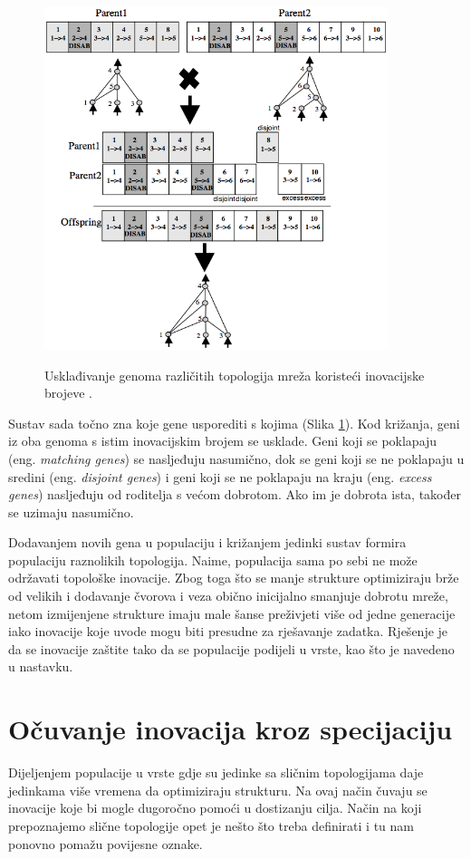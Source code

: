 \documentclass[times, utf8, seminar, numeric]{fer}
\begin{document}
\begin{figure}[ht]
  \centering
  \includegraphics[height=10cm]{slika3}\\
  \caption{Usklađivanje genoma različitih topologija mreža koristeći inovacijske brojeve \citep{rad2}.}
  \label{slika3}
\end{figure}

Sustav sada točno zna koje gene usporediti s kojima (Slika \ref{slika3}). Kod križanja, geni iz oba genoma s istim inovacijskim brojem se usklade. Geni koji se poklapaju (eng. \textit{matching genes}) se nasljeđuju nasumično, dok se geni koji se ne poklapaju u sredini (eng. \textit{disjoint genes}) i geni koji se ne poklapaju na kraju (eng. \textit{excess genes}) nasljeđuju od roditelja s većom dobrotom. Ako im je dobrota ista, također se uzimaju nasumično.

Dodavanjem novih gena u populaciju i križanjem jedinki sustav formira populaciju raznolikih topologija. Naime, populacija sama po sebi ne može održavati topološke inovacije. Zbog toga što se manje strukture optimiziraju brže od velikih i dodavanje čvorova i veza obično inicijalno smanjuje dobrotu mreže, netom izmijenjene strukture imaju male šanse preživjeti više od jedne generacije iako inovacije koje uvode mogu biti presudne za rješavanje zadatka. Rješenje je da se inovacije zaštite tako da se populacije podijeli u vrste, kao što je navedeno u nastavku.

\section{Očuvanje inovacija kroz specijaciju}
Dijeljenjem populacije u vrste gdje su jedinke sa sličnim topologijama daje jedinkama više vremena da optimiziraju strukturu. Na ovaj način čuvaju se inovacije koje bi mogle dugoročno pomoći u dostizanju cilja. Način na koji prepoznajemo slične topologije opet je nešto što treba definirati i tu nam ponovno pomažu povijesne oznake.
\end{document}
